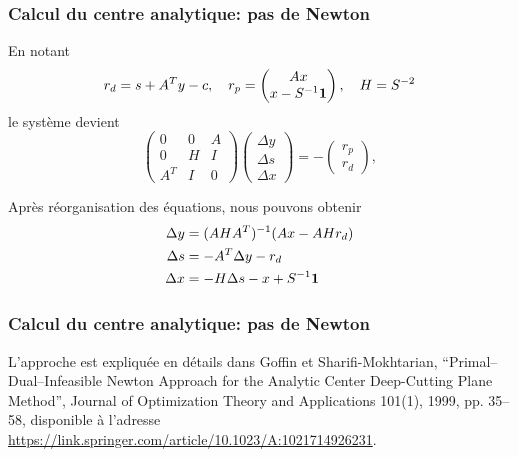 \documentclass[usepdftitle=false, aspectratio=169]{beamer}
\begin{document}
\begin{frame}
	\frametitle{Calcul du centre analytique: pas de Newton}

En notant	
$$
r_d = s + A^Ty - c,\quad r_p = \begin{pmatrix} Ax \\ x-S^{-1}{\boldsymbol{1}} \end{pmatrix},\quad H = S^{-2}
$$
le système devient
	$$
	\begin{pmatrix}
		0 & 0 & A \\ 0 & H & I \\ A^T & I & 0
	\end{pmatrix}
\begin{pmatrix}
	\Delta y \\ \Delta s \\ \Delta x
\end{pmatrix}
	=
	-
	\begin{pmatrix}
		r_p \\ r_d
	\end{pmatrix},
	$$

\mbox{}

Après réorganisation des équations, nous pouvons obtenir
\begin{align*}
	\Delta y &= (AHA^T)^{-1} (Ax - AHr_d )\\
	\Delta s &= -A^T\Delta y - r_d \\
	\Delta x &= -H\Delta s - x + S^{-1}{\boldsymbol{1}}
\end{align*}
	
\end{frame}

\begin{frame}
	\frametitle{Calcul du centre analytique: pas de Newton}
	
	
	\mbox{}
	
	L'approche est expliquée en détails dans Goffin et Sharifi-Mokhtarian, ``Primal--Dual--Infeasible Newton Approach for the Analytic Center Deep-Cutting Plane Method'', Journal of Optimization Theory and Applications 101(1), 1999, pp. 35--58, disponible à l'adresse \url{https://link.springer.com/article/10.1023/A:1021714926231}.
	
\end{frame}
\end{document}
